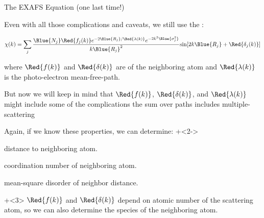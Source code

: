 \begin{slide}{The EXAFS Equation (one last time!)}

  Even with all those complications and caveats, we still use
  the {}:
  \vspace{-1mm}

  \begin{center}
    \[ \chi(k) = \sum_j {\frac{{\Blue{N_j}} {\Red{f_j(k)}}
        e^{-2{\Blue{R_j}}/{\Red{\lambda(k)}}}
        e^{-2k^2{\Blue{\sigma_j^2}}}}{k{\Blue{R_j}}^2}
      {\sin[{2k{\Blue{R_j}} + {\Red{\delta_j(k)}}] }}} \]
  \end{center}

  \vmm

  where $\Red{f(k)}$ and $\Red{\delta(k)}$ are
  {} of the neighboring
  atom and $ \Red{\lambda(k)} $ is the photo-electron mean-free-path.

  \vmm

  \begin{center}
    \begin{postitbox}{105mm}
      But now we will keep in mind that $\Red{f(k)}$, $\Red{\delta(k)}$,
      and $\Red{\lambda(k)}$       might include some of the complications
      {} the sum over paths includes multiple-scattering
    \end{postitbox}
  \end{center}

  \vmm
Again, if we know these properties, we can determine:
  \onslide+<2->
    \begin{description}
      \settowidth{\labelwidth}{15mm}
      \setlength{\itemindent}{15mm}
      \setlength{\leftmargin}{15mm}
    \item[$R$] distance to neighboring atom.
    \item[$N$] coordination number of neighboring atom.
    \item[$\sigma^2$] mean-square disorder of neighbor distance.
    \end{description}

  \vmm
  \onslide+<3>
  ${\Red{f(k)}}$ and ${\Red{\delta(k)}}$ depend on atomic number
  {} of the scattering atom, so we can also determine the
  species of the neighboring atom.

\end{slide}
